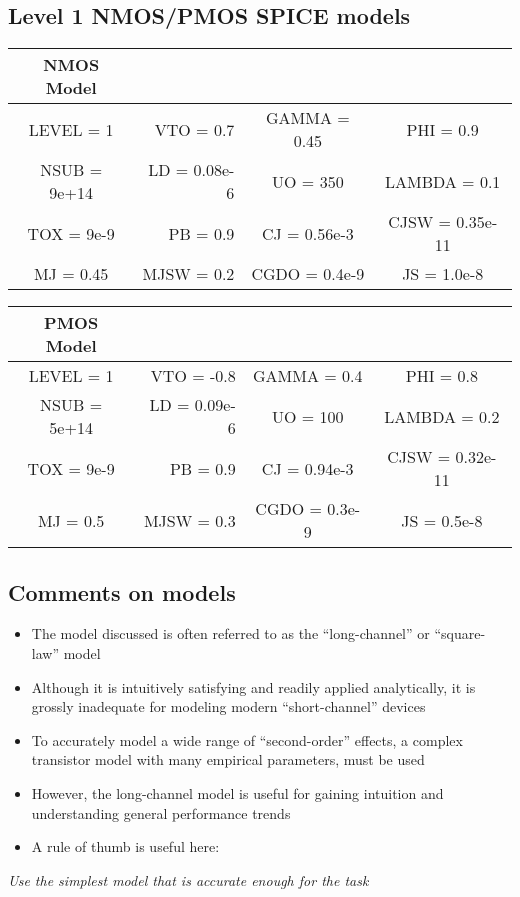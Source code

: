 \documentclass[11pt]{article}
\providecommand{\tightlist}{%
      \setlength{\itemsep}{0pt}\setlength{\parskip}{0pt}}
\begin{document}
    \hypertarget{level-1-nmospmos-spice-models}{%
\subsection{Level 1 NMOS/PMOS SPICE
models}\label{level-1-nmospmos-spice-models}}

    \begin{longtable}[]{@{}crcc@{}}
\toprule
NMOS Model & & &\tabularnewline
\midrule
\endhead
LEVEL = 1 & VTO = 0.7 & GAMMA = 0.45 & PHI = 0.9\tabularnewline
NSUB = 9e+14 & LD = 0.08e-6 & UO = 350 & LAMBDA = 0.1\tabularnewline
TOX = 9e-9 & PB = 0.9 & CJ = 0.56e-3 & CJSW = 0.35e-11\tabularnewline
MJ = 0.45 & MJSW = 0.2 & CGDO = 0.4e-9 & JS = 1.0e-8\tabularnewline
\bottomrule
\end{longtable}

\begin{longtable}[]{@{}crcc@{}}
\toprule
PMOS Model & & &\tabularnewline
\midrule
\endhead
LEVEL = 1 & VTO = -0.8 & GAMMA = 0.4 & PHI = 0.8\tabularnewline
NSUB = 5e+14 & LD = 0.09e-6 & UO = 100 & LAMBDA = 0.2\tabularnewline
TOX = 9e-9 & PB = 0.9 & CJ = 0.94e-3 & CJSW = 0.32e-11\tabularnewline
MJ = 0.5 & MJSW = 0.3 & CGDO = 0.3e-9 & JS = 0.5e-8\tabularnewline
\bottomrule
\end{longtable}

    \hypertarget{comments-on-models}{%
\subsection{Comments on models}\label{comments-on-models}}

    \begin{itemize}
\tightlist
\item
  The model discussed is often referred to as the ``long-channel'' or
  ``square-law'' model
\item
  Although it is intuitively satisfying and readily applied
  analytically, it is grossly inadequate for modeling modern
  ``short-channel'' devices
\item
  To accurately model a wide range of ``second-order'' effects, a
  complex transistor model with many empirical parameters, must be used
\item
  However, the long-channel model is useful for gaining intuition and
  understanding general performance trends
\item
  A rule of thumb is useful here:
\end{itemize}

\emph{Use the simplest model that is accurate enough for the task}
\end{document}
